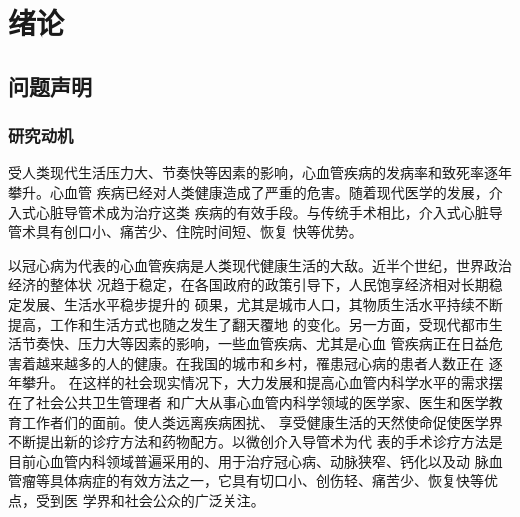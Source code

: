 \chapter{绪\;\;\;论}
\label{chap1}


\section{问题声明}
\label{sec1-1}


\subsection{研究动机}
\label{subsec1-1-1}

受人类现代生活压力大、节奏快等因素的影响，心血管疾病的发病率和致死率逐年攀升。心血管
疾病已经对人类健康造成了严重的危害。随着现代医学的发展，介入式心脏导管术成为治疗这类
疾病的有效手段。与传统手术相比，介入式心脏导管术具有创口小、痛苦少、住院时间短、恢复
快等优势。

以冠心病为代表的心血管疾病是人类现代健康生活的大敌。近半个世纪，世界政治经济的整体状
况趋于稳定，在各国政府的政策引导下，人民饱享经济相对长期稳定发展、生活水平稳步提升的
硕果，尤其是城市人口，其物质生活水平持续不断提高，工作和生活方式也随之发生了翻天覆地
的变化。另一方面，受现代都市生活节奏快、压力大等因素的影响，一些血管疾病、尤其是心血
管疾病正在日益危害着越来越多的人的健康。在我国的城市和乡村，罹患冠心病的患者人数正在
逐年攀升\cite{moh2010annual}\cite{moh2008annual}\cite{moh2007annual}\cite{moh2005annual}\cite{moh2004annual}。
在这样的社会现实情况下，大力发展和提高心血管内科学水平的需求摆在了社会公共卫生管理者
和广大从事心血管内科学领域的医学家、医生和医学教育工作者们的面前。使人类远离疾病困扰、
享受健康生活的天然使命促使医学界不断提出新的诊疗方法和药物配方。以微创介入导管术为代
表的手术诊疗方法是目前心血管内科领域普遍采用的、用于治疗冠心病、动脉狭窄、钙化以及动
脉血管瘤等具体病症的有效方法之一，它具有切口小、创伤轻、痛苦少、恢复快等优点，受到医
学界和社会公众的广泛关注。

